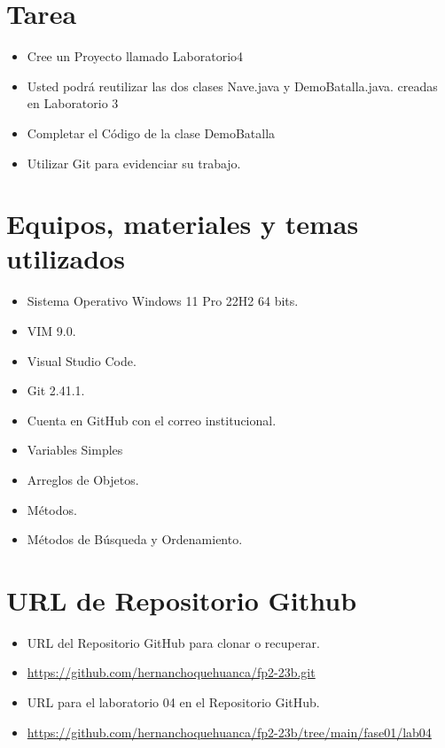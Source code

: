 \documentclass{article}
\begin{document}

	\section{Tarea}
	\begin{itemize}		
		\item Cree un Proyecto llamado Laboratorio4
        \item Usted podrá reutilizar las dos clases Nave.java y DemoBatalla.java. creadas en Laboratorio 3
        \item Completar el Código de la clase DemoBatalla
        
		\item Utilizar Git para evidenciar su trabajo.

	\end{itemize}
		
	\section{Equipos, materiales y temas utilizados}
	\begin{itemize}
		\item Sistema Operativo Windows 11 Pro 22H2 64 bits.
		\item VIM 9.0.
		\item Visual Studio Code.
		\item Git 2.41.1.
		\item Cuenta en GitHub con el correo institucional.
            \item Variables Simples
		\item Arreglos de Objetos.
        \item Métodos.
        \item Métodos de Búsqueda y Ordenamiento.
	\end{itemize}
	
	\section{URL de Repositorio Github}
	\begin{itemize}
		\item URL del Repositorio GitHub para clonar o recuperar.
        \item \url{https://github.com/hernanchoquehuanca/fp2-23b.git}
		\item URL para el laboratorio 04 en el Repositorio GitHub.
		\item \url{https://github.com/hernanchoquehuanca/fp2-23b/tree/main/fase01/lab04}
	\end{itemize}
	
\end{document}
